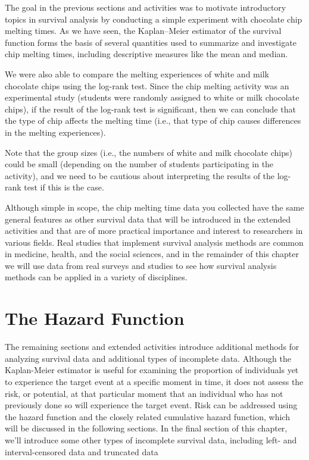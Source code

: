 \documentclass[
]{book}
\begin{document}
The goal in the previous sections and activities was to motivate introductory topics in survival analysis by conducting a simple experiment with chocolate chip melting times. As we have seen, the Kaplan--Meier estimator of the survival function forms the basis of several quantities used to summarize and investigate chip melting times, including descriptive measures like the mean and median.

We were also able to compare the melting experiences of white and milk chocolate chips using the log-rank test. Since the chip melting activity was an experimental study (students were randomly assigned to white or milk chocolate chips), if the result of the log-rank test is significant, then we can conclude that the type of chip affects the melting time (i.e., that type of chip causes differences in the melting experiences).

Note that the group sizes (i.e., the numbers of white and milk chocolate chips) could be small (depending on the number of students participating in the activity), and we need to be cautious about interpreting the results of the log-rank test if this is the case.

Although simple in scope, the chip melting time data you collected have the same general features as other survival data that will be introduced in the extended activities and that are of more practical importance and interest to researchers in various fields. Real studies that implement survival analysis methods are common in medicine, health, and the social sciences, and in the remainder of this chapter we will use data from real surveys and studies to see how survival analysis methods can be applied in a variety of disciplines.

\hypertarget{the-hazard-function}{%
\section{The Hazard Function}\label{the-hazard-function}}

The remaining sections and extended activities introduce additional methods for analyzing survival data and additional types of incomplete data. Although the Kaplan-Meier estimator is useful for examining the proportion of individuals yet to experience the target event at a specific moment in time, it does not assess the risk, or potential, at that particular moment that an individual who has not previously done so will experience the target event. Risk can be addressed using the hazard function and the closely related cumulative hazard function, which will be discussed in the following sections. In the final section of this chapter, we'll introduce some other types of incomplete survival data, including left- and interval-censored data and truncated data
\end{document}
